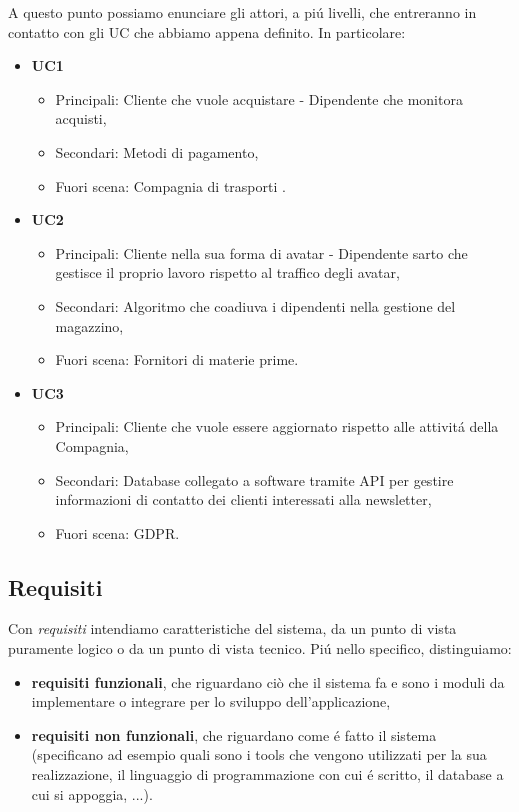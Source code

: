 \documentclass[12pt]{article}
\begin{document}
A questo punto possiamo enunciare gli attori, a pi\'u livelli, che entreranno in contatto con gli UC che abbiamo appena definito. In particolare:
\begin{itemize}
	\item \textbf{UC1}
		\begin{itemize}
		\item Principali: Cliente che vuole acquistare - Dipendente che monitora acquisti,
		\item Secondari: Metodi di pagamento,
		\item Fuori scena: Compagnia di trasporti .
		\end{itemize}
	\item \textbf{UC2}
		\begin{itemize}
		\item Principali: Cliente nella sua forma di avatar - Dipendente sarto che gestisce il proprio lavoro rispetto al traffico degli avatar,
		\item Secondari: Algoritmo che coadiuva i dipendenti nella gestione del magazzino,
		\item Fuori scena: Fornitori di materie prime.
		\end{itemize}
	\item \textbf{UC3}
		\begin{itemize}
		\item Principali: Cliente che vuole essere aggiornato rispetto alle attivit\'a della Compagnia, 
		\item Secondari: Database collegato a software tramite API per gestire informazioni di contatto dei clienti interessati alla newsletter,
		\item Fuori scena: GDPR.
		\end{itemize}
\end{itemize}

\subsection{Requisiti}

Con \textit{requisiti} intendiamo caratteristiche del sistema, da un punto di vista puramente logico o da un punto di vista tecnico. Pi\'u nello specifico, distinguiamo: 
\begin{itemize}
	\item \textbf{requisiti funzionali}, che riguardano ciò che il sistema fa e sono i moduli da implementare o integrare per lo sviluppo dell’applicazione,
	\item \textbf{requisiti non funzionali}, che riguardano come \'e fatto il sistema (specificano ad esempio quali sono i tools che vengono utilizzati per la sua realizzazione, il linguaggio di programmazione con cui \'e scritto, il database a cui si appoggia, ...).
\end{itemize}
\end{document}
